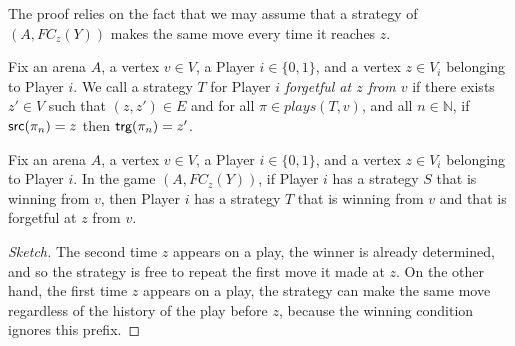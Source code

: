 \documentclass[a4paper,10pt]{article}
\begin{document}
The proof relies on the fact that we may assume that a strategy of $(A,FC_z(Y))$ makes the same move every time it reaches $z$.

\begin{definition}
Fix an arena $A$, a vertex $v \in V$, a Player $i \in \{0,1\}$, and a vertex $z \in V_i$ belonging to Player $i$. We call a strategy $T$ for Player $i$ {\em forgetful at $z$ from $v$} if there exists $z' \in V$ such that $(z,z') \in E$ and for all $\pi \in plays(T,v)$, and all $n \in \mathbb{N}$, if $\textsf{src}(\pi_n) = z$ then $\textsf{trg}(\pi_n) = z'$.
\end{definition}

\begin{lemma}\label{lem:forgetful at z}
Fix  an arena $A$, a vertex $v \in V$,
a Player $i \in \{0,1\}$, and a vertex $z \in V_i$ belonging to Player $i$.
In the game $(A,FC_z(Y))$, if Player $i$ has a strategy $S$ that is winning from $v$, then Player $i$ has a strategy $T$ that is winning from $v$ and that is forgetful at $z$ from $v$.
\end{lemma}

\begin{proof}[Sketch] 
The second time $z$ appears on a play, the winner is already determined, and so the strategy is free to repeat the first move it made at $z$. On the other hand, the first time $z$ appears on a play, 
the strategy can make the same move regardless of the history of the play before $z$, because the winning condition ignores this prefix.
\end{proof}
% 
% 
% 

\end{document}
